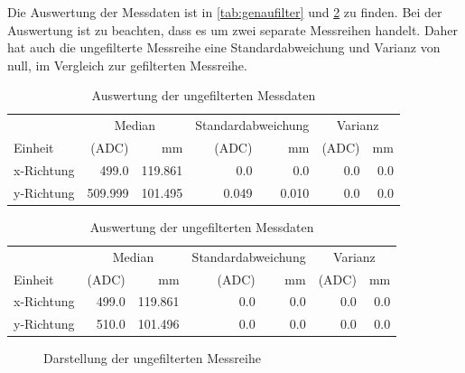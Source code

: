 Die Auswertung der Messdaten ist in \cref{tab:genaufilter} und \cref{tab:genauunfilter} zu finden.
Bei der Auswertung ist zu beachten, dass es um zwei separate Messreihen handelt.
Daher hat auch die ungefilterte Messreihe eine Standardabweichung und Varianz von null, im Vergleich zur gefilterten Messreihe.
\begin{table}[ht!]
    \caption{Auswertung der gefilterten Messdaten }
    \begin{center}
        \begin{tabular}{@{}lrrrrrr@{} }
            \toprule&\multicolumn{2}{c}{Median}& \multicolumn{2}{c}{Standardabweichung}&\multicolumn{2}{c}{Varianz} \\ 
            Einheit    &(ADC)              &mm             &(ADC)          &mm             &(ADC)      &mm\\\midrule
            x-Richtung & \SI{499,0}{}      & \SI{119,861}{}&\SI{0,0}{}     &\SI{0,0}{}     &\SI{0,0}{} & \SI{0,0}{} \\  
            y-Richtung & \SI{509,999}{}    & \SI{101,495}{}&\SI{0,049}{}   &\SI{0,010}{}   &\SI{0,0}{} & \SI{0,0}{} \\ \bottomrule
        \end{tabular}
        \label{tab:genaufilter}
    \end{center}   
    \caption{Auswertung der ungefilterten Messdaten}
    \begin{center}
        \begin{tabular}{@{}lrrrrrr@{} }
            \toprule&\multicolumn{2}{c}{Median}& \multicolumn{2}{c}{Standardabweichung}&\multicolumn{2}{c}{Varianz} \\ 
            Einheit    &(ADC)              &mm             &(ADC)          &mm             &(ADC)      &mm\\\midrule
            x-Richtung & \SI{499,0}{} & \SI{119,861}{}&\SI{0,0}{}&\SI{0,0}{}&\SI{0,0}{} & \SI{0,0}{} \\  
            y-Richtung & \SI{510,0}{} & \SI{101,496}{}&\SI{0,0}{}&\SI{0,0}{}&\SI{0,0}{} & \SI{0,0}{} \\ \bottomrule
        \end{tabular}
        \label{tab:genauunfilter}
    \end{center}   
\end{table}


\begin{figure}[ht!]
    \centering
    
    \caption{Darstellung der gefilterten Messreihe}
    \label{fig:filtered}
    \centering
    
    \caption{Darstellung der ungefilterten Messreihe}
    \label{fig:unfiltered}
\end{figure}

